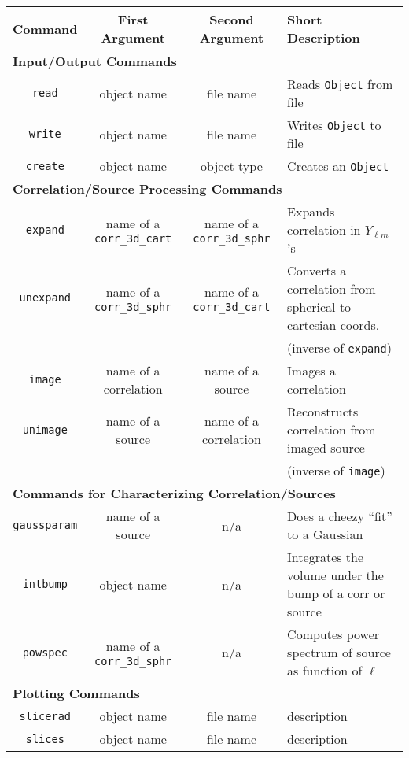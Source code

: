 \begin{table*}
\begin{tabular}{|c|c|c|l|}
    \hline\hline
    Command & First Argument  & Second Argument & Short Description\\ \hline\hline
    \multicolumn{4}{|l|}{\bf Input/Output Commands}\\ \hline
    {\tt read} & object name & file name  & Reads {\tt Object} from file \\ \hline
    {\tt write} & object name & file name & Writes {\tt Object} to file\\ \hline
    {\tt create} & object name & object type & Creates an {\tt Object}\\ \hline
    \multicolumn{4}{|l|}{\bf Correlation/Source Processing Commands}\\ \hline
    {\tt expand} & name of a {\tt corr\_3d\_cart} & name of a {\tt corr\_3d\_sphr} & Expands correlation in $Y_{\ell m}$'s\\ \hline
    {\tt unexpand} & name of a {\tt corr\_3d\_sphr} &  name of a {\tt corr\_3d\_cart}  & Converts a correlation from spherical to cartesian coords.\\
                   &                                &                                  & (inverse of {\tt expand})\\ \hline
    {\tt image} & name of a correlation & name of a source & Images a correlation\\ \hline
    {\tt unimage} & name of a source & name of a correlation & Reconstructs correlation from imaged source\\ 
                  &                  &                       & (inverse of {\tt image})\\ \hline
    \multicolumn{4}{|l|}{\bf Commands for Characterizing Correlation/Sources}\\ \hline
    {\tt gaussparam} & name of a source  & n/a & Does a cheezy ``fit'' to a Gaussian\\ \hline
    {\tt intbump} & object name & n/a & Integrates the volume under the bump of a corr or source\\ \hline
    {\tt powspec} & name of a {\tt corr\_3d\_sphr} & n/a & Computes power spectrum of source as function of $\ell$\\ \hline
    \multicolumn{4}{|l|}{\bf Plotting Commands}\\ \hline
    {\tt slicerad} & object name & file name & description\\ \hline
    {\tt slices} & object name & file name & description\\ \hline

\end{tabular}
\end{table*}
